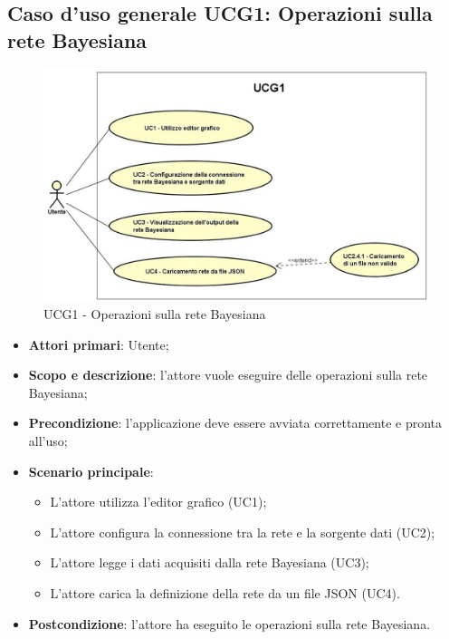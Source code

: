 \newpage
\subsection{Caso d'uso generale UCG1: Operazioni sulla rete Bayesiana}
\begin{figure} [H]
	\centering
	\includegraphics[scale=0.7]{Img/UCG1}
	\caption{UCG1 - Operazioni sulla rete Bayesiana}\label{}
\end{figure}
\begin{itemize}
	\item{\textbf{Attori primari}: Utente;}
	\item{\textbf{Scopo e descrizione}: l'attore vuole eseguire delle operazioni sulla rete Bayesiana;}
	\item{\textbf{Precondizione}: l'applicazione deve essere avviata correttamente e pronta all'uso;}
	\item{\textbf{Scenario principale}:
		\begin{itemize}
			\item{L'attore utilizza l'editor grafico (UC1);}
			\item{L'attore configura la connessione tra la rete e la sorgente dati (UC2);}
			\item{L'attore legge i dati acquisiti dalla rete Bayesiana (UC3)};
			\item{L'attore carica la definizione della rete da un file JSON (UC4).}
		\end{itemize}
	}
	\item{\textbf{Postcondizione}: l'attore ha eseguito le operazioni sulla rete Bayesiana.}
\end{itemize}


